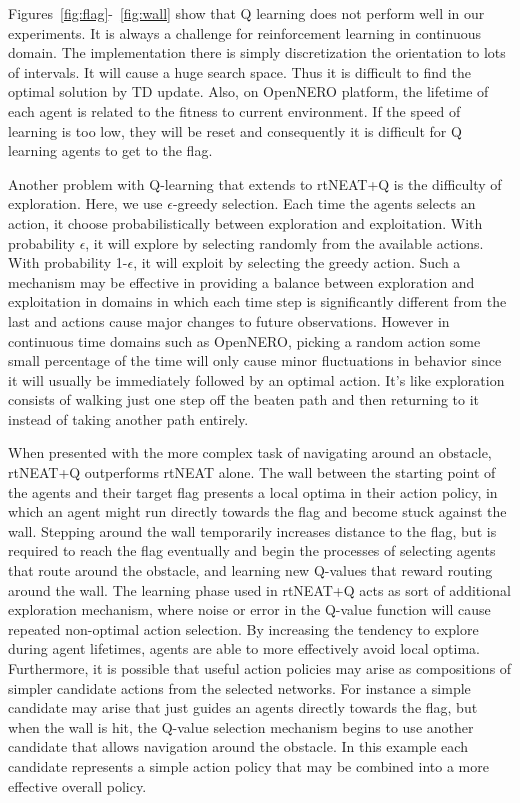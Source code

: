 \documentclass[letterpaper]{article}
\begin{document}
Figures~\ref{fig:flag}-~\ref{fig:wall} show that Q learning does not perform well in our experiments. It is always a challenge for reinforcement learning in continuous domain. The implementation there is simply discretization the orientation to lots of intervals. It will cause a huge search space. Thus it is difficult to find the optimal solution by TD update. Also, on OpenNERO platform, the lifetime of each agent is related to the fitness to current environment. If the speed of learning is too low, they will be reset and consequently it is difficult for Q learning agents to get to the flag. 

Another problem with Q-learning that extends to rtNEAT+Q is the difficulty of exploration. Here, we use $\epsilon$-greedy selection. Each time the agents selects an action, it choose probabilistically between exploration and exploitation. With probability $\epsilon$, it will explore by selecting randomly from the available actions. With probability 1-$\epsilon$, it will exploit by selecting the greedy action. Such a mechanism may be effective in providing a balance between exploration and exploitation in domains in which each time step is significantly different from the last and actions cause major changes to future observations. However in continuous time domains such as OpenNERO, picking a random action some small percentage of the time will only cause minor fluctuations in behavior since it will usually be immediately followed by an optimal action. It's like exploration consists of walking just one step off the beaten path and then returning to it instead of taking another path entirely. 

When presented with the more complex task of navigating around an obstacle, rtNEAT+Q outperforms rtNEAT alone. The wall between the starting point of the agents and their target flag presents a local optima in their action policy, in which an agent might run directly towards the flag and become stuck against the wall. Stepping around the wall temporarily increases distance to the flag, but is required to reach the flag eventually and begin the processes of selecting agents that route around the obstacle, and learning new Q-values that reward routing around the wall. The learning phase used in rtNEAT+Q acts as sort of additional exploration mechanism, where noise or error in the Q-value function will cause repeated non-optimal action selection. By increasing the tendency to explore during agent lifetimes, agents are able to more effectively avoid local optima. Furthermore, it is possible that useful action policies may arise as compositions of simpler candidate actions from the selected networks. For instance a simple candidate may arise that just guides an agents directly towards the flag, but when the wall is hit, the Q-value selection mechanism begins to use another candidate that allows navigation around the obstacle. In this example each candidate represents a simple action policy that may be combined into a more effective overall policy. 
\end{document}
